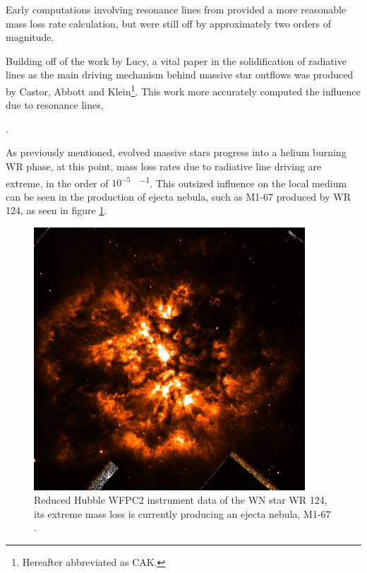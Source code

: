 

Early computations involving resonance lines from \cite{lucy_mass_1970} provided a more reasonable mass loss rate calculation, but were still off by approximately two orders of magnitude.

Building off of the work by Lucy, a vital paper in the solidification of radiative lines as the main driving mechanism behind massive star outflows was produced by Castor, Abbott and Klein\footnote{Hereafter abbreviated as CAK.}.
This work more accurately computed the influence due to resonance lines, 



\parencite{castor_radiation-driven_1975}.



As previously mentioned, evolved massive stars progress into a helium burning WR phase, at this point, mass loss rates due to radiative line driving are extreme, in the order of $10^{-5}$ \si{\solarmass\per\year}.
This outsized influence on the local medium can be seen in the production of ejecta nebula, such as M1-67 produced by WR 124, as seen in figure \ref{fig:wr124}.

\begin{figure}[h]
  \centering
  \includegraphics[width=4in]{assets/WR124.png}
  \caption[M1-67 nebula around WR 124]{Reduced Hubble WFPC2 instrument data of the WN star WR 124, its extreme mass loss is currently producing an ejecta nebula, M1-67 \parencite{2010ApJ...724L..90M}.}
  \label{fig:wr124}
\end{figure}

